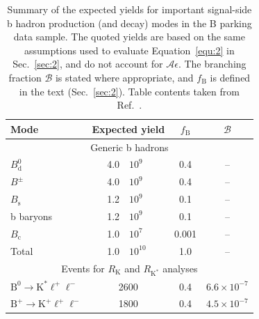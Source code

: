\documentclass{webofc}
\newcommand{\ellell}{\ensuremath{\ell^+\ell^-}\xspace}
\newcommand{\btok}{\ensuremath{\textrm{B}^+{\rightarrow}\textrm{K}^+}\xspace}
\newcommand{\btokst}{\ensuremath{\textrm{B}^0{\rightarrow}\textrm{K}^*}\xspace}
\newcommand{\btokll}{\ensuremath{\btok\ellell}\xspace}
\newcommand{\rk}{\ensuremath{R_{\textrm{K}}}\xspace}
\newcommand{\btokstll}{\ensuremath{\btokst\ellell}\xspace}
\newcommand{\rkst}{\ensuremath{R_{\textrm{K}^*}}\xspace}
\newcommand{\ate}{\ensuremath{\mathcal{A}\epsilon}\xspace}
\begin{document}
\begin{table}[!t]
  \small%
  \centering
  \caption{Summary of the expected yields for important signal-side b
    hadron production (and decay) modes in the B parking data sample.
    The quoted yields are based on the same assumptions used to
    evaluate Equation~\ref{equ:2} in Sec.~\ref{sec:2}, and do not
    account for \ate. The branching fraction $\mathcal{B}$ is stated
    where appropriate, and $f_{\textrm{B}}$ is defined in the text 
    (Sec.~\ref{sec:2}). Table contents taken from
    Ref.~\cite{bpark-dps}. 
  \label{tab:2}
  } 
  \begin{tabular}{lr@{$\:\times\:$}lcc}
    \hline
    Mode                           & 
    \multicolumn{2}{c}{Expected yield} & 
    $f_{\textrm{B}}$                 & 
    $\mathcal{B}$                                                                                \\
    \hline
    \multicolumn{5}{c}{Generic b hadrons}                                                        \\
    $B^0_\textrm{d}$               & 4.0                      & $10^9$    & 0.4   & --          \\
    $B^\pm$                        & 4.0                      & $10^9$    & 0.4   & --          \\
    $B_\textrm{s}$                 & 1.2                      & $10^9$    & 0.1   & --          \\
    b baryons                      & 1.2                      & $10^9$    & 0.1   & --          \\
    $B_\textrm{c}$                 & 1.0                      & $10^7$    & 0.001 & --          \\
    Total                          & 1.0                      & $10^{10}$ & 1.0   & --          \\
    \hline
    \multicolumn{5}{c}{Events for \rk and \rkst analyses}                                  \\
    \btokstll                      & \multicolumn{2}{c}{2600} & 0.4       & $6.6 \times 10^{-7}$ \\
    \btokll                        & \multicolumn{2}{c}{1800} & 0.4       & $4.5 \times 10^{-7}$ \\
    \hline
  \end{tabular}
\end{table}
\end{document}
